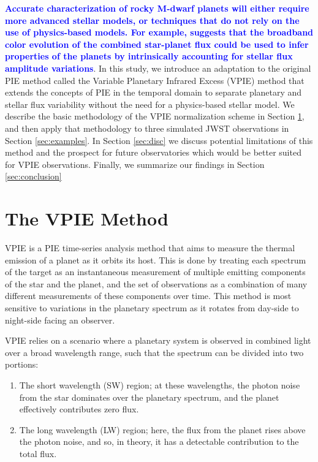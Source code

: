 \documentclass[twocolumn,linenumbers]{aastex7}
\newcommand{\update}[1]{\textcolor{blue}{\bf #1}}
\begin{document}
\update{Accurate characterization of rocky M-dwarf planets will either require more advanced stellar models, or techniques that do not rely on the use of physics-based models. For example, \citep{deming2026} suggests that the broadband color evolution of the combined star-planet flux could be used to infer properties of the planets by intrinsically accounting for stellar flux amplitude variations}.
In this study, we introduce an adaptation to the original PIE method called the Variable Planetary Infrared Excess (VPIE) method that extends the concepts of PIE in the temporal domain to separate planetary and stellar flux variability without the need for a physics-based stellar model. We describe the basic methodology of the VPIE normalization scheme in Section \ref{sec:vpie}, and then apply that methodology to three simulated JWST observations in Section \ref{sec:examples}. In Section \ref{sec:disc} we discuss potential limitations of this method and the prospect for future observatories which would be better suited for VPIE observations. Finally, we summarize our findings in Section \ref{sec:conclusion}
\section{The VPIE Method}
\label{sec:vpie}

VPIE is a PIE time-series analysis method that aims to measure the thermal emission of a planet as it orbits its host. This is done by treating each spectrum of the target as an instantaneous measurement of multiple emitting components of the star and the planet, and the set of observations as a combination of many different measurements of these components over time. This method is most sensitive to variations in the planetary spectrum as it rotates from day-side to night-side facing an observer. 

VPIE relies on a scenario where a planetary system is observed in combined light over a broad wavelength range, such that the spectrum can be divided into two portions:
\begin{enumerate}
    \item The short wavelength (SW) region; at these wavelengths, the photon noise from the star dominates over the planetary spectrum, and the planet effectively contributes zero flux.
    \item The long wavelength (LW) region; here, the flux from the planet rises above the photon noise, and so, in theory, it has a detectable contribution to the total flux.
\end{enumerate}
\end{document}
